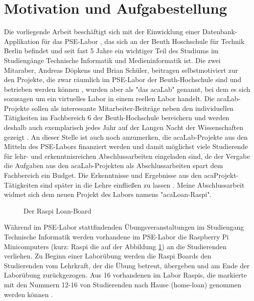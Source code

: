 \section{Motivation und Aufgabestellung}
\label{sec:intro:motivation}
Die vorliegende Arbeit beschäftigt sich mit der Einwicklung einer Datenbank-Applikation für das PSE-Labor \cite{website:17}, das sich an der Beuth Hoschschule für Technik Berlin befindet und seit fast 5 Jahre ein wichtiger Teil des Studiums im Studiengänge Technische Informatik und Medieninformatik ist. Die zwei Mitaraber, Andreas Döpkens und Brian Schüler, beitragen selbstmotiviert zur den  Projekte, die zwar räumlich im PSE-Labor der Beuth-Hochschule sind und betrieben werden können \cite{website:1}, wurden aber als "das acaLab" genannt, bei dem es sich sozusagen um ein virtuelles Labor in einem reellen Labor handelt. Die acaLab-Projekte sollen als interessante Mitarbeiter-Beiträge neben den individuellen Tätigkeiten im Fachbereich 6 der Beuth-Hochschule bereichern und werden deshalb auch exemplarisch jedes Jahr auf der Langen Nacht der Wissenschaften gezeigt \cite{website:1}. An dieser Stelle ist auch noch anzumerken, die acaLab-Projekte aus den Mitteln des PSE-Labors finanziert werden und damit möglichst viele Studierende für lehr- und erkenntnisreichen Abschlussarbeiten eingeladen sind, de der Vergabe die Aufgaben aus den acaLab-Projekten als Abschlussarbeiten spart dem Fachbereich ein Budget. Die Erkenntnisse und Ergebnisse aus den acaProjekt-Tätigkeiten sind später in die Lehre einfließen zu lassen \cite{website:1}. Meine Abschlussarbeit widmet sich dem neuen Projekt des Labors namens "acaLoan-Raspi".

\begin{figure}
	\caption{Der Raspi Loan-Board }
	\label{fig:raspiLab}
\end{figure}
Während im PSE-Labor stattfindenden Übungsveranstaltungen im Studiengang Technische Informatik werden vorhandene im PSE-Labor die Raspberry Pi Minicomputers (kurz: Raspi die auf der Abbildung \ref{fig:raspiLab})  an die Studierenden verliehen. Zu Beginn einer Laborübung werden die Raspi Boards den Studierenden vom Lehrkraft, der die Übung betreut, übergeben und am Ende der Laborübung zurückgezogen. Aus 16 vorhandenen im Labor Raspis, die markierte mit den Nummern 12-16 von Studierenden nach Hause (home-loan) genommen werden können \cite{website:1}. 

